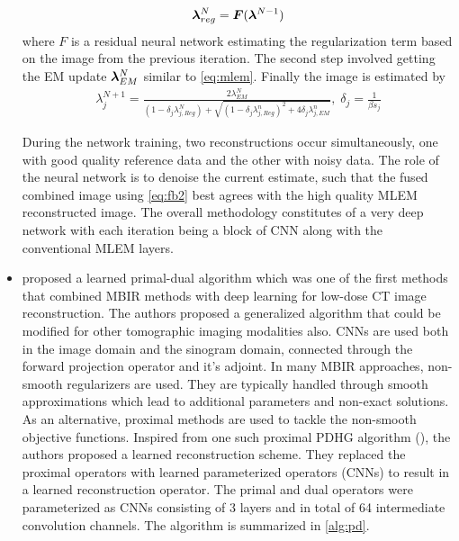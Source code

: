 \begin{itemize}
\begin{equation}\label{eq:fbs1}
\bm{\lambda}_{reg}^N = \bm{F}(\bm{\lambda}^{N-1})
\end{equation} 
where $F$ is a residual neural network estimating the regularization term based on the image from the previous iteration. 
The second step involved getting the EM update $\bm{\lambda}_{EM}^{N}$ similar to \ref{eq:mlem}. Finally the image is estimated by
\begin{equation}\label{eq:fb2}
\begin{array}{l}
\lambda_j^{N+1} 
=\frac{2 \lambda_{E M}^{N}}{\left(1-\delta_{j} \lambda_{j, R e g}^{N}\right)+\sqrt{\left(1-\delta_{j} \lambda_{j, R e g}^{n}\right)^{2}+4 \delta_{j} \lambda_{j, E M}^{n}}} ,\; \delta_{j}=\frac{1}{\beta s_{j}}
\end{array}
\end{equation}

During the network training, two reconstructions occur simultaneously, one with good quality reference data and the other with noisy data. The role of the neural network is to denoise the current estimate, such that the fused combined image using \ref{eq:fb2} best agrees with the high quality \ac{MLEM} reconstructed image. The overall methodology constitutes of a very deep network with each iteration being a block of \ac{CNN} along with the conventional \ac{MLEM} layers. 


\item \cite{adler2018learned} proposed a learned primal-dual algorithm which was one of the first methods that combined \ac{MBIR} methods with deep learning for low-dose \ac{CT} image reconstruction. The authors proposed a generalized algorithm that could be modified for other tomographic imaging modalities also. \acp{CNN} are used both in the image domain and the sinogram domain, connected through the forward projection operator and it's adjoint. In many \ac{MBIR} approaches, non-smooth regularizers are used. They are typically handled through smooth approximations which lead to additional parameters and non-exact solutions. As an alternative, proximal methods are used to tackle the non-smooth objective functions. Inspired from one such proximal \ac{PDHG} algorithm (\cite{chambolle2011first}), the authors proposed a learned reconstruction scheme. They replaced the proximal operators with learned parameterized operators (\acp{CNN}) to result in a learned reconstruction operator. The primal and dual operators were parameterized as \acp{CNN} consisting of 3 layers and in total of 64 intermediate convolution channels. The algorithm is summarized in \ref{alg:pd}. 


\end{itemize}
